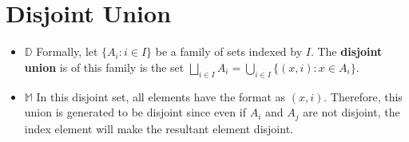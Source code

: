 \documentclass[11pt]{article}
\begin{document}
\section{Disjoint Union}
\label{sec:org57c2fdd}
\begin{itemize}
\item \(\mathbb{D}\) Formally, let \(\{A_{i}:i\in I\}\) be a family of sets indexed by \(I\). The \textbf{disjoint union} is of this family is the set \(\underset{{i\in I}}\bigsqcup A_{i} = \underset{{i\in I}}\bigcup\{(x, i): x\in A_{i}\}\).
\item \(\mathbb{M}\) In this disjoint set, all elements have the format as \((x, i)\). Therefore, this union is generated to be disjoint since even if \(A_{i}\) and \(A_{j}\) are not disjoint, the index element will make the resultant element disjoint.
\end{itemize}
\end{document}

